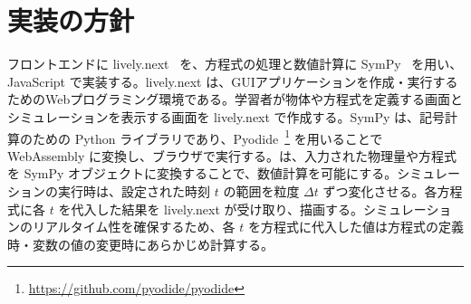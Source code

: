 \chapter{実装の方針} \label{implementation}

フロントエンドに lively.next~\cite{ingalls_2008} を、方程式の処理と数値計算に SymPy~\cite{meurer_sympy_2017} を用い、JavaScript で実装する。lively.next は、GUIアプリケーションを作成・実行するためのWebプログラミング環境である。学習者が物体や方程式を定義する画面とシミュレーションを表示する画面を lively.next で作成する。SymPy は、記号計算のための Python ライブラリであり、Pyodide~\footnote{\tiny{\url{https://github.com/pyodide/pyodide}}} を用いることで WebAssembly に変換し、ブラウザで実行する。\simname は、入力された物理量や方程式を SymPy オブジェクトに変換することで、数値計算を可能にする。シミュレーションの実行時は、設定された時刻 $t$ の範囲を粒度 $\Delta t$ ずつ変化させる。各方程式に各 $t$ を代入した結果を lively.next が受け取り、描画する。シミュレーションのリアルタイム性を確保するため、各 $t$ を方程式に代入した値は方程式の定義時・変数の値の変更時にあらかじめ計算する。





